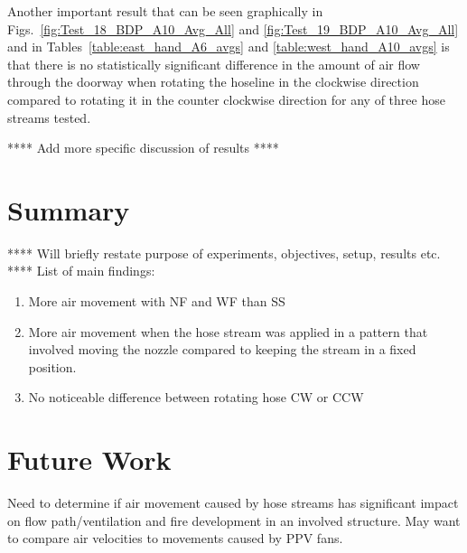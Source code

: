 \documentclass[12pt,oneside]{book}
\begin{document}
Another important result that can be seen graphically in Figs.~\ref{fig:Test_18_BDP_A10_Avg_All} and \ref{fig:Test_19_BDP_A10_Avg_All} and in Tables~\ref{table:east_hand_A6_avgs} and \ref{table:west_hand_A10_avgs} is that there is no statistically significant difference in the amount of air flow through the doorway when rotating the hoseline in the clockwise direction compared to rotating it in the counter clockwise direction for any of three hose streams tested. 

**** Add more specific discussion of results **** 

%
%

\chapter{Summary}
\label{chap:summary}
**** Will briefly restate purpose of experiments, objectives, setup, results etc. ****
List of main findings:
\begin{enumerate}
\item More air movement with NF and WF than SS
\item More air movement when the hose stream was applied in a pattern that involved moving the nozzle compared to keeping the stream in a fixed position.
\item No noticeable difference between rotating hose CW or CCW
\end{enumerate}

\chapter{Future Work}
\label{chap:Future_Work}
Need to determine if air movement caused by hose streams has significant impact on flow path/ventilation and fire development in an involved structure. May want to compare air velocities to movements caused by PPV fans.
\end{document}
